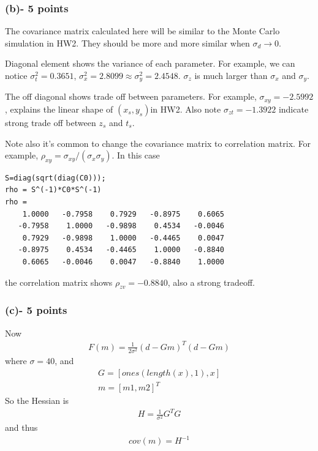 \documentclass[11pt]{article}
\begin{document}
\subsubsection*{(b)- 5 points}
The covariance matrix calculated here will be similar to the Monte Carlo simulation in HW2. They should be more and more similar when $\sigma_d \rightarrow 0$. 

Diagonal element shows the variance of each parameter. For example, we can notice $\sigma_t^2=0.3651$, $\sigma_x^2 = 2.8099 \approx \sigma_y^2 = 2.4548$. $\sigma_z$ is much larger than $\sigma_x$ and $\sigma_y$. 

The off diagonal shows trade off between parameters. 
For example, $\sigma_{xy} = -2.5992$, explains the linear shape of $(x_s,y_s)$in HW2. Also note $\sigma_{zt}=-1.3922$ indicate strong trade off between $z_s$ and $t_s$. 

Note also it's common to change the covariance matrix to correlation matrix. For example, $\rho_{xy} = \sigma_{xy}/(\sigma_x \sigma_y)$. In this case 

\begin{verbatim}
S=diag(sqrt(diag(C0)));
rho = S^(-1)*C0*S^(-1)
rho =
    1.0000   -0.7958    0.7929   -0.8975    0.6065
   -0.7958    1.0000   -0.9898    0.4534   -0.0046
    0.7929   -0.9898    1.0000   -0.4465    0.0047
   -0.8975    0.4534   -0.4465    1.0000   -0.8840
    0.6065   -0.0046    0.0047   -0.8840    1.0000
\end{verbatim}

the correlation matrix shows $\rho_{zv}=-0.8840$, also a strong tradeoff. 

\subsubsection*{(c)- 5 points}
Now
\begin{eqnarray*}
F(m) = \frac{1}{2\sigma^2} (d - G m)^T (d-G m)
\end{eqnarray*}
where $\sigma=40$, and 
\begin{eqnarray*}
G= [ones(length(x),1),  x]\\
m =[m1, m2]^T
\end{eqnarray*}
So the Hessian is
\begin{eqnarray*}
H = \frac{1}{\sigma^2} G^T G
\end{eqnarray*}
and thus
\begin{eqnarray*}
cov(m) = H^{-1} 
\end{eqnarray*}
\end{document}
